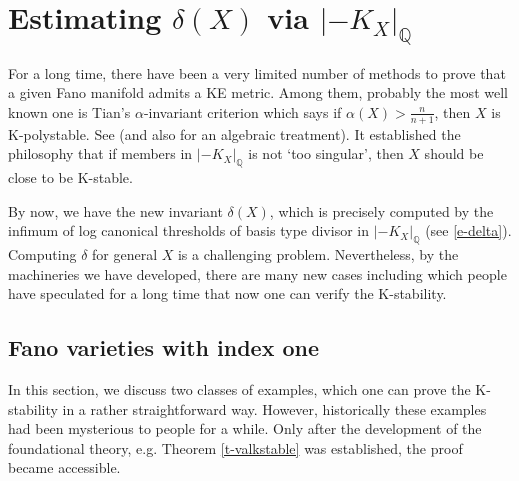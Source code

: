 \documentclass[12pt,reqno]{amsart}%
\theoremstyle{definition}
\theoremstyle{remark}
\newcommand{\bQ}{{\mathbb{Q}}}
\begin{document}
\section{Estimating $\delta(X)$ via $|-K_X|_{\mathbb{Q}}$}\label{s-sing}
For a long time, there have been a very limited number of methods to prove that a given Fano manifold admits a KE metric. Among them, probably the most well known one is Tian's $\alpha$-invariant criterion which says if $\alpha(X)>\frac{n}{n+1}$, then $X$ is K-polystable. See \cite{Tia87} (and also \cite{OS12} for an algebraic treatment). 
It established the philosophy that if members in $|-K_X|_{\mathbb{Q}}$ is not `too singular', then $X$ should be close to be K-stable.

By now, we have the new invariant $\delta(X)$, which is precisely computed by the infimum of log canonical thresholds of basis type divisor in $|-K_X|_{\bQ}$ (see \eqref{e-delta}).  Computing $\delta$ for general $X$ is a challenging problem. Nevertheless,  by the machineries we have developed, there are many new cases including which people have speculated for a long time that now one can verify the K-stability.  

\subsection{Fano varieties with index one}
In this section, we discuss two classes of examples, which one can prove the K-stability in a rather straightforward way. However, historically these examples had been mysterious to people for a while. Only after the development of the foundational theory, e.g. Theorem \ref{t-valkstable} was established, the proof became accessible.  
\end{document}
